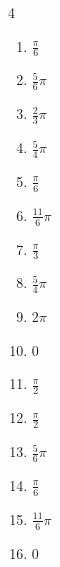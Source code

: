 \begin{multicols}{4}
\begin{enumerate}
  \item $\displaystyle \frac{\pi}{6}$

  \item $\displaystyle \frac{5}{6}\pi$

  \item $\displaystyle \frac{2}{3}\pi$

  \item $\displaystyle \frac{5}{4}\pi$

  \item $\displaystyle \frac{\pi}{6}$

  \item $\displaystyle \frac{11}{6}\pi$

  \item $\displaystyle \frac{\pi}{3}$

  \item $\displaystyle \frac{5}{4}\pi$

  \item $\displaystyle 2\pi$

  \item $\displaystyle 0$

  \item $\displaystyle \frac{\pi}{2}$

\columnbreak %

  \item $\displaystyle \frac{\pi}{2}$

  \item $\displaystyle \frac{5}{6}\pi$

  \item $\displaystyle \frac{\pi}{6}$

  \item $\displaystyle \frac{11}{6}\pi$

  \item $\displaystyle 0$


\end{enumerate}
\end{multicols}
